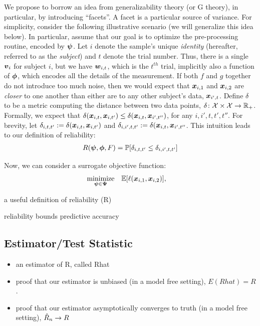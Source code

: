 \documentclass{article}
\begin{document}
We propose to borrow an idea from generalizability theory (or G theory), in particular, by introducing ``facets''.  A facet is a particular source of variance.  For simplicity, consider the following illustrative scenario (we will generalize this idea below). In particular, assume that our goal is to optimize the pre-processing routine, encoded by $\boldsymbol{\psi}$. Let $i$ denote the sample's unique \emph{identity} (hereafter, referred to as the \emph{subject}) and $t$ denote the trial number.  Thus, there is a single $\boldsymbol{v}_i$ for subject $i$, but we have $\boldsymbol{w}_{i,t}$, which is the $t^{th}$ trial, implicitly also a function of $\boldsymbol{\phi}$, which encodes all the details of the measurement.  If both $f$ and $g$ together do not introduce too much noise, then we would expect that $\boldsymbol{x}_{i,1}$ and $\boldsymbol{x}_{i,2}$ are \emph{closer} to one another than either are to any other subject's data, $\boldsymbol{x}_{i',t}$.  Define $\delta$ to be a metric computing the distance between two data points, $\delta {\ensuremath{\colon}} \mathcal{X} \times \mathcal{X} \to \mathbb{R}_+$.  Formally, we expect that $\delta(\boldsymbol{x}_{i,t},\boldsymbol{x}_{i,t'}) \leq \delta(\boldsymbol{x}_{i,t},\boldsymbol{x}_{i',t''})$, for any $i,i',t,t',t''$.  
For brevity, let $\delta_{i,t,t'}:=\delta(\boldsymbol{x}_{i,t}, \boldsymbol{x}_{i,t'})$ and 
$\delta_{i,i',t,t'}:=\delta(\boldsymbol{x}_{i,t}, \boldsymbol{x}_{i',t''}$.  
This intuition leads to our definition of reliability:
\begin{align}
R(\boldsymbol{\psi},\boldsymbol{\phi},F) = \mathbb{P}[ \delta_{i,t,t'} \leq \delta_{i,i',t,t'}]
\end{align}


Now, we can consider a surrogate objective function:
\begin{equation} \label{eq:surroage}
\begin{aligned}
& \underset{\boldsymbol{\psi} \in \boldsymbol{\Psi}}{\text{minimize}}
& & \mathbb{E} [ \ell( \boldsymbol{x}_{i,1}, \boldsymbol{x}_{i,2})],
\end{aligned}
\end{equation}




a useful definition of reliability (R)

\begin{thm}
reliability bounds predictive accuracy
\end{thm}

\subsection{Estimator/Test Statistic}

\begin{itemize}
\item an estimator of R, called Rhat

\item proof that our estimator is unbiased (in a model free setting), 
$E(Rhat)=R$.

\item proof that our estimator asymptotically converges to truth (in a model free setting), $\hat{R}_n \rightarrow R$
\end{itemize}
\end{document}

